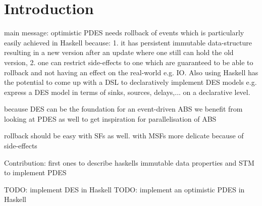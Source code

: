 \section{Introduction}
main message: optimistic PDES needs rollback of events which is particularly easily achieved in Haskell because: 1. it has persistent immutable data-structure resulting in a new version after an update where one still can hold the old version, 2. one can restrict side-effects to one which are guaranteed to be able to rollback and not having an effect on the real-world e.g. IO. Also using Haskell has the potential to come up with a DSL to declaratively implement DES models e.g. express a DES model in terms of sinks, sources, delays,... on a declarative level.

because DES can be the foundation for an event-driven ABS we benefit from looking at PDES as well to get inspiration for parallelisation of ABS

rollback should be easy with SFs as well. with MSFs more delicate because of side-effects

Contribution: first ones to describe haskells immutable data properties and STM to implement PDES

TODO: implement DES in Haskell
TODO: implement an optimistic PDES in Haskell